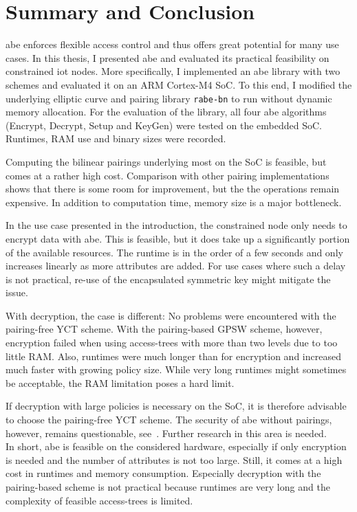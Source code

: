 \chapter{Summary and Conclusion}

\acrfull{abe} enforces flexible access control and thus offers great potential for many use cases.
In this thesis, I presented \acrshort{abe} and evaluated its practical feasibility on constrained \acrshort{iot} nodes.
More specifically, I implemented an \acrshort{abe} library with two schemes and evaluated it on an ARM Cortex-M4 SoC.
To this end, I modified the underlying elliptic curve and pairing library \texttt{rabe-bn} to run without dynamic memory allocation.
For the evaluation of the library, all four \acrshort{abe} algorithms (Encrypt, Decrypt, Setup and KeyGen) were tested on the embedded SoC.
Runtimes, RAM use and binary sizes were recorded.

Computing the bilinear pairings underlying most  on the SoC is feasible, but comes at a rather high cost.
Comparison with other pairing implementations shows that there is some room for improvement, but the the operations remain expensive.
In addition to computation time, memory size is a major bottleneck.

In the use case presented in the introduction, the constrained node only needs to encrypt data with \acrshort{abe}.
This is feasible, but it does take up a significantly portion of the available resources.
The runtime is in the order of a few seconds and only increases linearly as more attributes are added.
For use cases where such a delay is not practical, re-use of the encapsulated symmetric key might mitigate the issue.

With decryption, the case is different: 
No problems were encountered with the pairing-free YCT scheme.
With the pairing-based GPSW scheme, however, encryption failed when using \glspl{access-tree} with more than two levels due to too little RAM.
Also, runtimes were much longer than for encryption and increased much faster with growing policy size.
While very long runtimes might sometimes be acceptable, the RAM limitation poses a hard limit.

If decryption with large policies is necessary on the SoC, it is therefore advisable to choose the pairing-free YCT scheme.
The security of \acrshort{abe} without pairings, however, remains questionable, see~\cite{herranz_attacking_2020}.
Further research in this area is needed.\\

In short, \acrlong{abe} is feasible on the considered hardware, especially if only encryption is needed and the number of attributes is not too large.
Still, it comes at a high cost in runtimes and memory consumption.
Especially decryption with the pairing-based scheme is not practical because runtimes are very long and the complexity of feasible \glspl{access-tree} is limited.